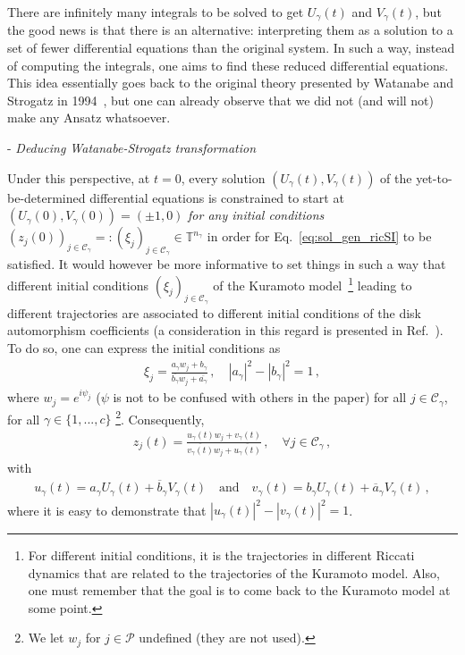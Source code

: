 \documentclass[aps,pre,reprint,longbibliography,superscriptaddress,noshowpacs,floatfix]{revtex4-2}
\theoremstyle{definition}
\theoremstyle{remark}
\begin{document}
There are infinitely many integrals to be solved to get $U_{\gamma}(t)$ and $V_{\gamma}(t)$, but the good news is that there is an alternative: interpreting them as a solution to a set of fewer differential equations than the original system. In such a way, instead of computing the integrals, one aims to find these reduced differential equations. This idea essentially goes back to the original theory presented by Watanabe and Strogatz in 1994~\cite{Watanabe1994}, but one can already observe that we did not (and will not) make any Ansatz whatsoever.

\vspace{0.3cm}
\noindent- \textit{Deducing Watanabe-Strogatz transformation}
\vspace{0.3cm}

Under this perspective, at $t = 0$, every solution $(U_{\gamma}(t), V_{\gamma}(t))$ of the yet-to-be-determined differential equations is constrained to start at $(U_{\gamma}(0), V_{\gamma}(0)) = (\pm 1, 0)$  \textit{for any initial conditions} $(z_j(0))_{j\in \mathcal{C}_\gamma} =: (\xi_j)_{j\in \mathcal{C}_\gamma} \in \mathbb{T}^{n_{\gamma}}$ in order for Eq.~\eqref{eq:sol_gen_ricSI} to be satisfied. It would however be more informative to set things in such a way that different initial conditions $(\xi_j)_{j\in \mathcal{C}_\gamma}$ of the Kuramoto model~\footnote{For different initial conditions, it is the trajectories in different Riccati dynamics that are related to the trajectories of the Kuramoto model. Also, one must remember that the goal is to come back to the Kuramoto model at some point.} leading to different trajectories are associated to different initial conditions of the disk automorphism coefficients (a consideration in this regard is presented in Ref.~\cite[section 4.2.1]{Watanabe1994}). To do so, one can express the initial conditions as
\begin{align*}
    \xi_j = \frac{a_{\gamma}w_j + b_{\gamma}}{\overline{b_{\gamma}}w_j + \overline{a
    _{\gamma}}}\,,\quad |a_{\gamma}|^2 - |b_{\gamma}|^2 = 1\,,
\end{align*}
where $w_j = e^{i\psi_j}$ ($\psi$ is not to be confused with others in the paper) for all $j\in \mathcal{C}_\gamma$, for all $\gamma\in\{1,...,c\}$ \footnote{We let $w_j$ for $j\in \mathcal{P}$ undefined (they are not used).}. Consequently,
\begin{align}\label{eq:ws_UVSI}
    z_j(t) = \frac{u_{\gamma}(t)w_j + v_{\gamma}(t)}{\overline{v_{\gamma}(t)}w_j + \overline{u_{\gamma}(t)}}\,,\quad \forall j\in \mathcal{C}_\gamma\,,
\end{align}
with
\begin{align*}
    u_{\gamma}(t) = a_{\gamma}U_{\gamma}(t) + \overline{b}_{\gamma}V_{\gamma}(t)\quad \text{and} \quad v_{\gamma}(t) = b_{\gamma}U_{\gamma}(t) + \overline{a}_{\gamma}V_{\gamma}(t)\,,
\end{align*}
where it is easy to demonstrate that $|u_{\gamma}(t)|^2 - |v_{\gamma}(t)|^2 = 1$. 
\end{document}
